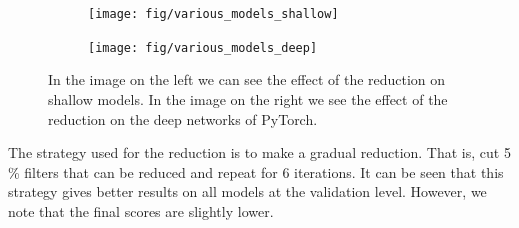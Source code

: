 \documentclass[12pt]{article}
\begin{document}
\begin{figure}[H]
	\centering
	\begin{subfigure}[b]{0.5\textwidth}            
		\texttt{[image: fig/various\_models\_shallow]}
		\label{fig:SRl}
	\end{subfigure}%
	\begin{subfigure}[b]{0.5\textwidth}
		\centering
		\texttt{[image: fig/various\_models\_deep]}
		\label{fig:D-Imager}
	\end{subfigure}
	\caption{In the image on the left we can see the effect of the reduction on shallow models. In the image on the right we see the effect of the reduction on the deep networks of PyTorch.}
\end{figure}
The strategy used for the reduction is to make a gradual reduction. That is, cut 5 \% filters that can be reduced and repeat for 6 iterations. It can be seen that this strategy gives better results on all models at the validation level. However, we note that the final scores are slightly lower.
\end{document}
